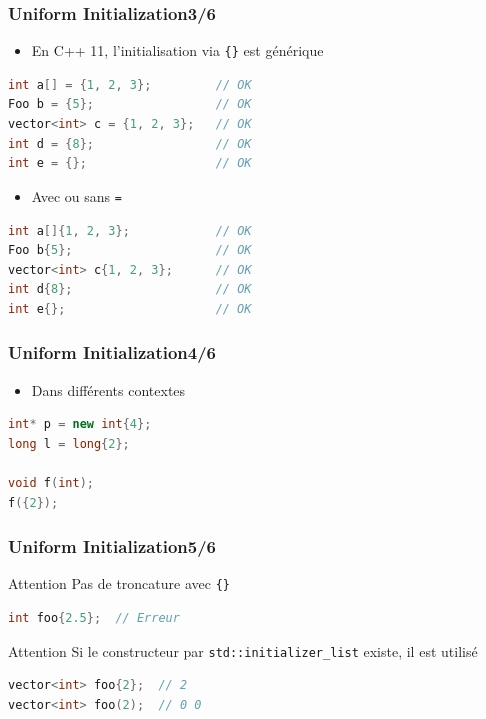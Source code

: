 \documentclass[C++.tex]{subfiles}
\begin{document}
\begin{frame}[fragile]
	\frametitle{Uniform Initialization\titlehfill{}3/6}
	\begin{itemize}
		\item En C++ 11, l'initialisation via \lstinline|{}| est générique
	\end{itemize}

	\begin{lstlisting}[language=C++]
int a[] = {1, 2, 3};         // OK
Foo b = {5};                 // OK
vector<int> c = {1, 2, 3};   // OK
int d = {8};                 // OK
int e = {};                  // OK\end{lstlisting}

	\pause

	\begin{itemize}
		\item Avec ou sans \lstinline|=|
	\end{itemize}

	\begin{lstlisting}[language=C++]
int a[]{1, 2, 3};            // OK
Foo b{5};                    // OK
vector<int> c{1, 2, 3};      // OK
int d{8};                    // OK
int e{};                     // OK\end{lstlisting}
\end{frame}

\begin{frame}[fragile]
	\frametitle{Uniform Initialization\titlehfill{}4/6}
	\begin{itemize}
		\item Dans différents contextes
	\end{itemize}

	\begin{lstlisting}[language=C++]
int* p = new int{4};
long l = long{2};

void f(int);
f({2});\end{lstlisting}
\end{frame}

\begin{frame}[fragile]
	\frametitle{Uniform Initialization\titlehfill{}5/6}
	\begin{alertblock}{Attention}
		Pas de troncature avec \lstinline|{}|

		\begin{lstlisting}[language=C++]
int foo{2.5};  // Erreur\end{lstlisting}
	\end{alertblock}

	\pause

	\begin{alertblock}{Attention}
		Si le constructeur par \lstinline|std::initializer_list| existe, il est utilisé

		\begin{lstlisting}[language=C++]
vector<int> foo{2};  // 2
vector<int> foo(2);  // 0 0\end{lstlisting}
	\end{alertblock}
\end{frame}
\end{document}
